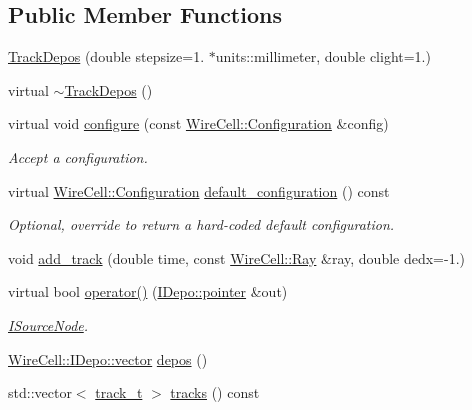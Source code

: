 \subsection*{Public Member Functions}
\begin{DoxyCompactItemize}
\item 
\hyperlink{class_wire_cell_1_1_gen_1_1_track_depos_afe4fb6691d2d50e382987d53ed581eb7}{Track\+Depos} (double stepsize=1. $\ast$units\+::millimeter, double clight=1.)
\item 
virtual \hyperlink{class_wire_cell_1_1_gen_1_1_track_depos_a41f8d22bd935a3f211bee15f2dbbef2c}{$\sim$\+Track\+Depos} ()
\item 
virtual void \hyperlink{class_wire_cell_1_1_gen_1_1_track_depos_a0a3e984c40fe60a0b8fbd451091a008b}{configure} (const \hyperlink{namespace_wire_cell_a9f705541fc1d46c608b3d32c182333ee}{Wire\+Cell\+::\+Configuration} \&config)
\begin{DoxyCompactList}\small\item\em Accept a configuration. \end{DoxyCompactList}\item 
virtual \hyperlink{namespace_wire_cell_a9f705541fc1d46c608b3d32c182333ee}{Wire\+Cell\+::\+Configuration} \hyperlink{class_wire_cell_1_1_gen_1_1_track_depos_ad96354353f477b5efeed326167b5b531}{default\+\_\+configuration} () const
\begin{DoxyCompactList}\small\item\em Optional, override to return a hard-\/coded default configuration. \end{DoxyCompactList}\item 
void \hyperlink{class_wire_cell_1_1_gen_1_1_track_depos_adae13601f092202fbdc66c3d0be8be8a}{add\+\_\+track} (double time, const \hyperlink{namespace_wire_cell_a3ab20d9b438feb7eb1ffaab9ba98af0c}{Wire\+Cell\+::\+Ray} \&ray, double dedx=-\/1.)
\item 
virtual bool \hyperlink{class_wire_cell_1_1_gen_1_1_track_depos_a336b9bcb6d5d3e494ff295d7a70c94cc}{operator()} (\hyperlink{class_wire_cell_1_1_i_data_aff870b3ae8333cf9265941eef62498bc}{I\+Depo\+::pointer} \&out)
\begin{DoxyCompactList}\small\item\em \hyperlink{class_wire_cell_1_1_i_source_node}{I\+Source\+Node}. \end{DoxyCompactList}\item 
\hyperlink{class_wire_cell_1_1_i_data_ae1a9f863380499bb43f39fabb6276660}{Wire\+Cell\+::\+I\+Depo\+::vector} \hyperlink{class_wire_cell_1_1_gen_1_1_track_depos_a443e4c53c68ad46102395e7e86d24653}{depos} ()
\item 
std\+::vector$<$ \hyperlink{class_wire_cell_1_1_gen_1_1_track_depos_a70b397dea6bfcd6d4181a1716b0f3e54}{track\+\_\+t} $>$ \hyperlink{class_wire_cell_1_1_gen_1_1_track_depos_a9a2eca2798c0655336150e7237e8c5cd}{tracks} () const
\end{DoxyCompactItemize}


